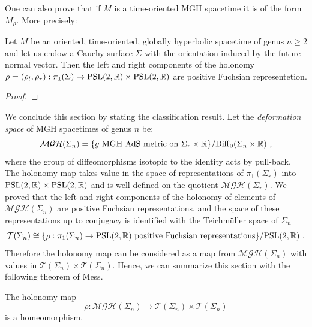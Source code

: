 One can also prove that if $M$ is a time-oriented MGH spacetime it is of the form $M_\rho$. More precisely:
\begin{proposition}
    Let $M$ be an oriented, time-oriented, globally hyperbolic spacetime of genus $n\geq 2$ and let us endow a Cauchy surface $\Sigma$ with the orientation induced by the future normal vector. Then the left and right components of the holonomy $\rho=(\rho_l,\rho_r): \pi_1(\Sigma)\to\text{PSL}(2,\mathbb{R})\times\text{PSL}(2,\mathbb{R})$ are positive Fuchsian representetion.
\end{proposition}
\begin{proof}
\end{proof}

We conclude this section by stating the classification result. Let the \emph{deformation space} of MGH spacetimes of genus $n$ be:
$$\mathcal{MGH}(\Sigma_n)=\{g\text{ MGH AdS metric on }\Sigma_r\times\mathbb{R}\}/\mathrm{Diff}_0(\Sigma_n\times\mathbb{R})~,$$
where the group of diffeomorphisms isotopic to the identity acts by pull-back. The holonomy map takes value in the space of representations of $\pi_1(\Sigma_r)$ into $\text{PSL}(2,\mathbb{R})\times\text{PSL}(2,\mathbb{R})$ and is well-defined on the quotient $\mathcal{MGH}(\Sigma_r)$.
We proved that the left and right components of the holonomy of elements of $\mathcal{MGH}(\Sigma_n)$ are positive Fuchsian representations, and the space of these representations up to conjugacy is identified with the Teichm\"uller space of $\Sigma_n$
\[
    \mathcal{T}(\Sigma_n)\cong\{\rho:\pi_1(\Sigma_n)\to\text{PSL}(2,\mathbb{R})\text{ positive Fuchsian representations}\}/\text{PSL}(2,\mathbb{R})~.
\]
Therefore the holonomy map can be considered as a map 
from $\mathcal{MGH}(\Sigma_n)$ with values in $\mathcal{T}(\Sigma_n)\times\mathcal{T}(\Sigma_n)$.
Hence, we can summarize this section with the following theorem of Mess.

\begin{theorem} \label{thm:classification rgeq2}
The holonomy map $$\rho:\mathcal{MGH}(\Sigma_n)\to\mathcal{T}(\Sigma_n)\times\mathcal{T}(\Sigma_n)$$ is a homeomorphism.
\end{theorem}